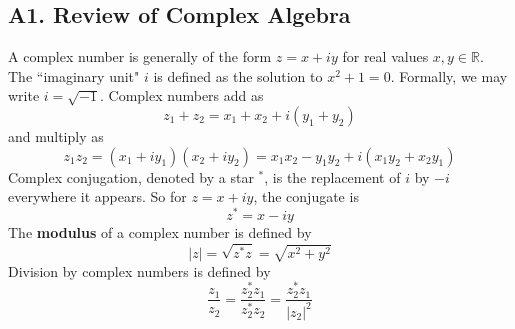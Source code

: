 \documentclass[onecolumn]{gwclass}
\begin{document}
\subsection*{A1. Review of Complex Algebra}
A complex number is generally of the form $z=x+iy$ for real values $x,y\in\mathbb{R}$. The ``imaginary unit" $i$ is defined as the solution to $x^2+1=0$. Formally, we may write $i=\sqrt{-1}$. Complex numbers add as 
$$ z_1 + z_2 = x_1+x_2 + i(y_1+y_2) $$
and multiply as 
$$ z_1z_2 = (x_1+iy_1)(x_2+iy_2)= x_1x_2 - y_1y_2 + i(x_1y_2 + x_2y_1) $$
Complex conjugation, denoted by a star $^*$, is the replacement of $i$ by $-i$ everywhere it appears. So for $z=x+iy$, the conjugate is
$$ z^* = x - iy $$
The \textbf{modulus} of a complex number is defined by
$$ |z| = \sqrt{z^*z} = \sqrt{x^2+y^2} $$
Division by complex numbers is defined by
$$ \frac{z_1}{z_2} = \frac{z_2^*z_1}{z_2^*z_2} = \frac{z_2^*z_1}{|z_2|^2} $$





	
\end{document}
